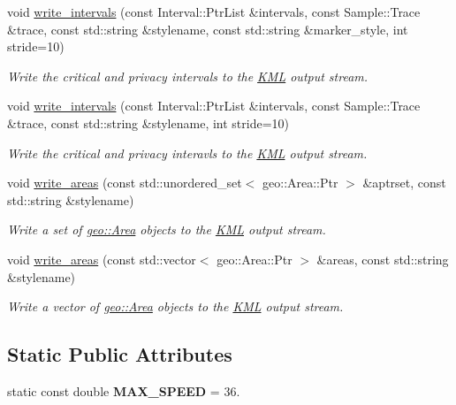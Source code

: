 \begin{DoxyCompactItemize}
void \hyperlink{classgeo__data_1_1KML_a1acf0f483bb9a9063e22b665595b7a73}{write\+\_\+intervals} (const Interval\+::\+Ptr\+List \&intervals, const Sample\+::\+Trace \&trace, const std\+::string \&stylename, const std\+::string \&marker\+\_\+style, int stride=10)
\begin{DoxyCompactList}\small\item\em Write the critical and privacy intervals to the \hyperlink{classgeo__data_1_1KML}{K\+ML} output stream. \end{DoxyCompactList}\item 
void \hyperlink{classgeo__data_1_1KML_a59e90e9f806505f53e95910d8133c26d}{write\+\_\+intervals} (const Interval\+::\+Ptr\+List \&intervals, const Sample\+::\+Trace \&trace, const std\+::string \&stylename, int stride=10)
\begin{DoxyCompactList}\small\item\em Write the critical and privacy interavls to the \hyperlink{classgeo__data_1_1KML}{K\+ML} output stream. \end{DoxyCompactList}\item 
void \hyperlink{classgeo__data_1_1KML_aadfd649bf63dfa12f6d90b60e5cc2f81}{write\+\_\+areas} (const std\+::unordered\+\_\+set$<$ geo\+::\+Area\+::\+Ptr $>$ \&aptrset, const std\+::string \&stylename)
\begin{DoxyCompactList}\small\item\em Write a set of \hyperlink{classgeo_1_1Area}{geo\+::\+Area} objects to the \hyperlink{classgeo__data_1_1KML}{K\+ML} output stream. \end{DoxyCompactList}\item 
void \hyperlink{classgeo__data_1_1KML_a687a0d88d709e6b9d6e9f566f80efba7}{write\+\_\+areas} (const std\+::vector$<$ geo\+::\+Area\+::\+Ptr $>$ \&areas, const std\+::string \&stylename)
\begin{DoxyCompactList}\small\item\em Write a vector of \hyperlink{classgeo_1_1Area}{geo\+::\+Area} objects to the \hyperlink{classgeo__data_1_1KML}{K\+ML} output stream. \end{DoxyCompactList}\end{DoxyCompactItemize}
\subsection*{Static Public Attributes}
\begin{DoxyCompactItemize}
\item 
static const double {\bfseries M\+A\+X\+\_\+\+S\+P\+E\+ED} = 36.\hypertarget{classgeo__data_1_1KML_ab44c2f5b2be77eec82125b8c49385a96}{}\label{classgeo__data_1_1KML_ab44c2f5b2be77eec82125b8c49385a96}

\end{DoxyCompactItemize}


